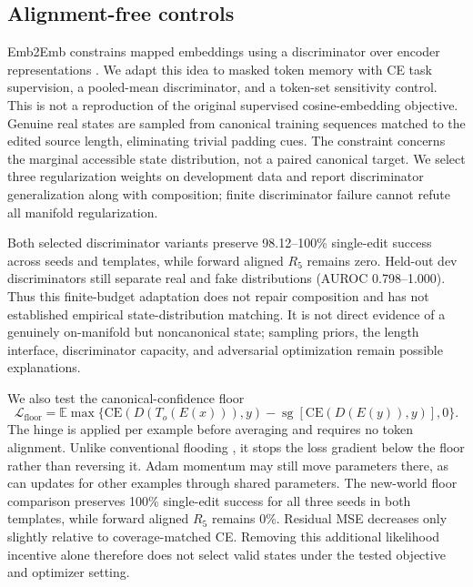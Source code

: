 \documentclass[11pt]{article}
\begin{document}
\subsection{Alignment-free controls}
Emb2Emb constrains mapped embeddings using a discriminator over encoder
representations \cite{mai2020emb2emb}. We adapt this idea to masked token
memory with CE task supervision, a pooled-mean discriminator, and a token-set
sensitivity control. This is not a reproduction of the original supervised
cosine-embedding objective. Genuine real states are sampled from canonical
training sequences matched to the edited source length, eliminating trivial
padding cues. The constraint concerns the marginal accessible state
distribution, not a paired canonical target. We select three regularization
weights on development data and report discriminator generalization along
with composition; finite discriminator failure cannot refute all manifold
regularization.

Both selected discriminator variants preserve 98.12--100\% single-edit success
across seeds and templates, while forward aligned $R_5$ remains zero.
Held-out dev discriminators still separate real and fake distributions
(AUROC 0.798--1.000). Thus this finite-budget adaptation does not repair
composition and has not established empirical state-distribution matching.
It is not direct evidence of a genuinely on-manifold but noncanonical state;
sampling priors, the length interface, discriminator capacity, and adversarial
optimization remain possible explanations.

We also test the canonical-confidence floor
\begin{equation}
 \mathcal L_{\mathrm{floor}}=
 \mathbb E\max\{\mathrm{CE}(D(T_o(E(x))),y)
 -\operatorname{sg}[\mathrm{CE}(D(E(y)),y)],0\}.
\end{equation}
The hinge is applied per example before averaging and requires no token
alignment. Unlike conventional flooding \cite{ishida2020flooding}, it stops the
loss gradient below the floor rather than reversing it. Adam momentum may
still move parameters there, as can updates for other examples through shared
parameters. The new-world floor comparison preserves 100\% single-edit success
for all three seeds in both templates, while forward aligned $R_5$ remains
0\%. Residual MSE decreases only slightly relative to coverage-matched CE.
Removing this additional likelihood incentive alone therefore does not select
valid states under the tested objective and optimizer setting.


\end{document}
